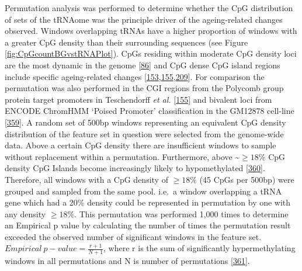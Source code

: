 \documentclass[
]{book}
\begin{document}
Permutation analysis was performed to determine whether the CpG distribution of sets of the tRNAome was the principle driver of the ageing-related changes observed.
Windows overlapping tRNAs have a higher proportion of windows with a greater CpG density than their surrounding sequences (see Figure \ref{fig:CpGcountBGvstRNAPlot}).
CpGs residing within moderate CpG density loci are the most dynamic in the genome {[}\protect\hyperlink{ref-Ziller2013}{86}{]} and CpG dense CpG island regions include specific ageing-related changes {[}\protect\hyperlink{ref-Rakyan2010}{153},\protect\hyperlink{ref-Teschendorff2010}{155},\protect\hyperlink{ref-Bell2016}{209}{]}.
For comparison the permutation was also performed in the CGI regions from the Polycomb group protein target promoters in Teschendorff \emph{et al.} {[}\protect\hyperlink{ref-Teschendorff2010}{155}{]} and bivalent loci from ENCODE ChromHMM `Poised Promoter' classification in the GM12878 cell-line {[}\protect\hyperlink{ref-Ernst2011}{359}{]}.
A random set of 500bp windows representing an equivalent CpG density distribution of the feature set in question were selected from the genome-wide data.
Above a certain CpG density there are insufficient windows to sample without replacement within a permutation.
Furthermore, above \textasciitilde{}\(\ge18\%\) CpG density CpG Islands become increasingly likely to hypomethylated {[}\protect\hyperlink{ref-Bell2012a}{360}{]}.
Therefore, all windows with a CpG density of \(\ge18\%\) (45 CpGs per 500bp) were grouped and sampled from the same pool.
i.e.~a window overlapping a tRNA gene which had a 20\% density could be represented in permutation by one with any density \(\ge18\%\).
This permutation was performed 1,000 times to determine an Empirical p value by calculating the number of times the permutation result exceeded the observed number of significant windows in the feature set.
\(Empirical~p-value = \frac{r+1}{N+1}\), where r is the sum of significantly hypermethylating windows in all permutations and N is number of permutations {[}\protect\hyperlink{ref-North2003}{361}{]}.
\end{document}

